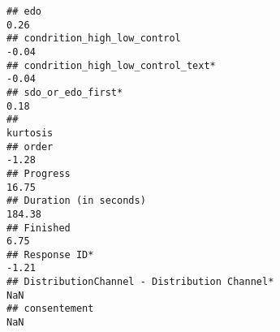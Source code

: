 \documentclass[
]{article}
\begin{document}
\begin{verbatim}
## edo                                                                                                                                                                                                                          0.26
## condrition_high_low_control                                                                                                                                                                                                 -0.04
## condrition_high_low_control_text*                                                                                                                                                                                           -0.04
## sdo_or_edo_first*                                                                                                                                                                                                            0.18
##                                                                                                                                                                                                                            kurtosis
## order                                                                                                                                                                                                                         -1.28
## Progress                                                                                                                                                                                                                      16.75
## Duration (in seconds)                                                                                                                                                                                                        184.38
## Finished                                                                                                                                                                                                                       6.75
## Response ID*                                                                                                                                                                                                                  -1.21
## DistributionChannel - Distribution Channel*                                                                                                                                                                                     NaN
## consentement                                                                                                                                                                                                                    NaN

\end{verbatim}
\end{document}
